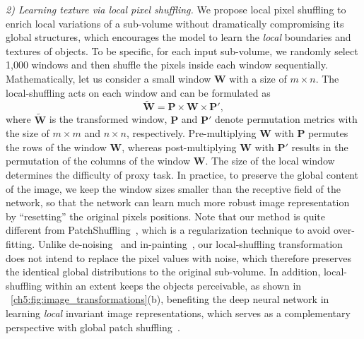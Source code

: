 \textit{2) Learning texture via local pixel shuffling.} We propose local pixel shuffling to enrich local variations of a sub-volume without dramatically compromising its global structures, which encourages the model to learn the {\em local} boundaries and textures of objects. To be specific, for each input sub-volume, we randomly select 1,000 windows and then shuffle the pixels inside each window sequentially. Mathematically, let us consider a small window $\mathbf{W}$ with a size of $m\times n$.
The local-shuffling acts on each window and can be formulated as
\begin{equation}
    \tilde{\mathbf{W}}=\mathbf{P}\times\mathbf{W}\times\mathbf{P}',
\end{equation}
where $\tilde{\mathbf{W}}$ is the transformed window, $\mathbf{P}$ and $\mathbf{P}'$ denote permutation metrics with the size of $m\times m$ and $n\times n$, respectively. Pre-multiplying $\mathbf{W}$ with $\mathbf{P}$ permutes the rows of the window $\mathbf{W}$, whereas post-multiplying $\mathbf{W}$ with $\mathbf{P}'$ results in the permutation of the columns of the window $\mathbf{W}$. The size of the local window determines the difficulty of proxy task. In practice, to preserve the global content of the image, we keep the window sizes smaller than the receptive field of the network, so that the network can learn much more robust image representation by ``resetting'' the original pixels positions. Note that our method is quite different from PatchShuffling~\citep{kang2017patchshuffle}, which is a regularization technique to avoid over-fitting. Unlike de-noising~\citep{vincent2010stacked} and in-painting~\citep{pathak2016context,iizuka2017globally}, our local-shuffling transformation does not intend to replace the pixel values with noise, which therefore preserves the identical global distributions to the original sub-volume. 
In addition, local-shuffling within an extent keeps the objects perceivable, as shown in \figurename~\ref{ch5:fig:image_transformations}(b), benefiting the deep neural network in learning \textit{local} invariant image representations, which serves as a complementary perspective with global patch shuffling~\citep{chen2019self}.


